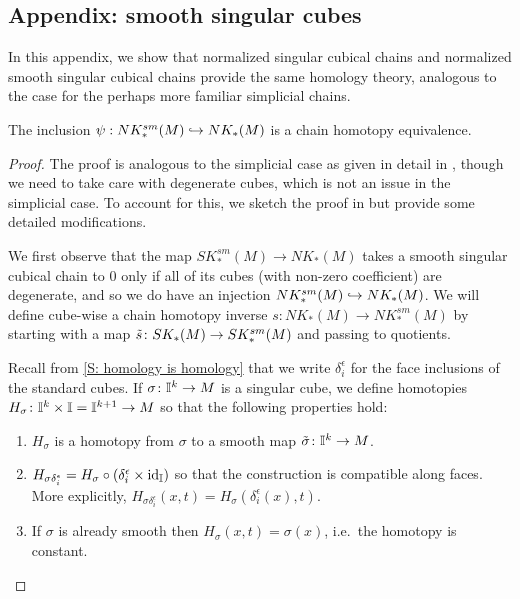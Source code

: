 \subsection{Appendix: smooth singular cubes}\label{S: smooth cubes}

In this appendix, we show that normalized singular cubical chains and normalized smooth singular cubical chains provide the same homology theory, analogous to the case for the perhaps more familiar simplicial chains.

\begin{proposition}\label{P: singular smooth cubes}
	The inclusion $\psi: NK^{sm}_*(M) \hookrightarrow NK_*(M)$ is a chain homotopy equivalence.
\end{proposition}

\begin{proof}
	The proof is analogous to the simplicial case as given in detail in \cite[Theorem 18.7]{Lee13}, though we need to take care with degenerate cubes, which is not an issue in the simplicial case.
	To account for this, we sketch the proof in \cite{Lee13} but provide some detailed modifications.

	We first observe that the map $SK^{sm}_*(M) \to NK_*(M)$ takes a smooth singular cubical chain to $0$ only if all of its cubes (with non-zero coefficient) are degenerate, and so we do have an injection $NK^{sm}_*(M) \hookrightarrow NK_*(M)$.
	We will define cube-wise a chain homotopy inverse $s \colon NK_*(M) \to NK^{sm}_*(M)$ by starting with a map $\tilde s \colon SK_*(M) \to SK^{sm}_*(M)$ and passing to quotients.

	Recall from \cref{S: homology is homology} that we write $\delta_i^\epsilon$ for the face inclusions of the standard cubes.
	If $\sigma \colon \mathbb{I}^k \to M$ is a singular cube, we define homotopies $H_\sigma \colon \mathbb{I}^k \times \mathbb{I} = \mathbb{I}^{k+1} \to M$ so that the following properties hold:
	\begin{enumerate}
		\item\label{I: smooth} $H_\sigma$ is a homotopy from $\sigma$ to a smooth map $\tilde \sigma \colon \mathbb{I}^k \to M$.

		\item\label{I: faces} $H_{\sigma \delta_i^\epsilon} = H_\sigma \circ (\delta_i^\epsilon \times \mathrm{id}_{\mathbb{I}})$ so that the construction is compatible along faces.
		More explicitly, $H_{\sigma \delta_i^\epsilon}(x,t) = H_\sigma(\delta_i^\epsilon(x),t)$.

		\item\label{I: already smooth} If $\sigma$ is already smooth then $H_{\sigma}(x,t) = \sigma(x)$, i.e.\ the homotopy is constant.


\end{enumerate}
\end{proof}
